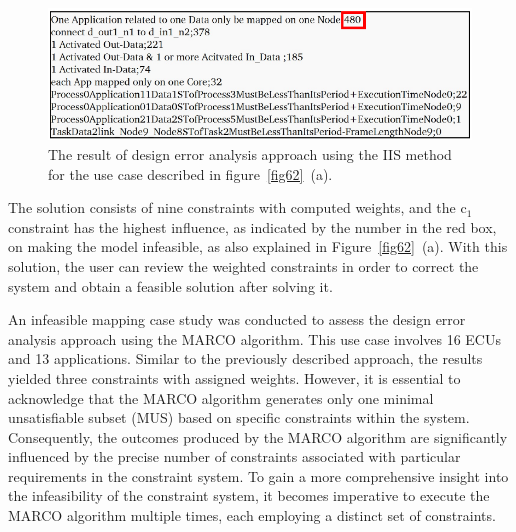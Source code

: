         \begin{figure}[t]
    	\centering
    	\includegraphics[width=1\columnwidth]{figures/de_output1.pdf}
    	\caption{The result of design error analysis approach using the IIS method for the use case described in figure~\ref{fig62}~(a).}
    	\label{fig64}
    \end{figure}
        
    
   The solution consists of nine constraints with computed weights, and the c$_1$ constraint has the highest influence, as indicated by the number in the red box, on making the model infeasible, as also explained in Figure~\ref{fig62}~(a). With this solution, the user can review the weighted constraints in order to correct the system and obtain a feasible solution after solving it.

    An infeasible mapping case study was conducted to assess the design error analysis approach using the MARCO algorithm. This use case involves 16 ECUs and 13 applications. Similar to the previously described approach, the results yielded three constraints with assigned weights. However, it is essential to acknowledge that the MARCO algorithm generates only one minimal unsatisfiable subset (MUS) based on specific constraints within the system. Consequently, the outcomes produced by the MARCO algorithm are significantly influenced by the precise number of constraints associated with particular requirements in the constraint system.
    To gain a more comprehensive insight into the infeasibility of the constraint system, it becomes imperative to execute the MARCO algorithm multiple times, each employing a distinct set of constraints.
 
